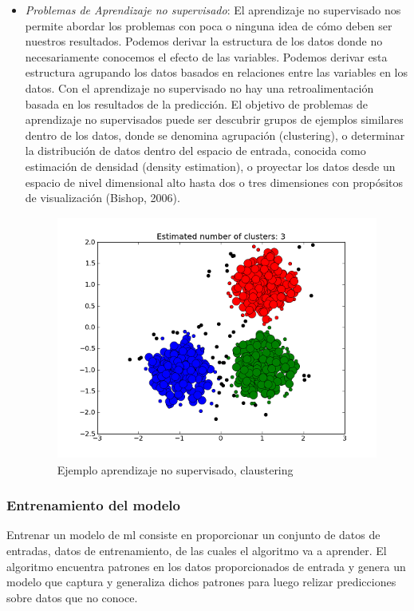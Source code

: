 \begin{itemize}
\item \textit{Problemas de Aprendizaje no supervisado}: El aprendizaje no supervisado nos permite abordar los problemas con
poca o ninguna idea de cómo deben ser nuestros resultados. Podemos derivar la estructura de los datos donde no necesariamente conocemos el efecto de las variables. Podemos derivar esta estructura agrupando los datos basados en relaciones entre las variables en los datos. Con el aprendizaje no supervisado no hay una retroalimentación basada en los resultados de la predicción. El objetivo de problemas de aprendizaje no supervisados puede ser descubrir grupos de ejemplos similares dentro de los datos, donde se denomina agrupación (clustering), o determinar la distribución de datos dentro del espacio de entrada, conocida como estimación de densidad (density estimation), o proyectar los datos desde un espacio de nivel dimensional alto hasta dos o tres dimensiones con propósitos de visualización (Bishop, 2006).

\begin{figure}[H] \centering
  \includegraphics[height=8cm,keepaspectratio=true,clip=true]{imagenes/MarcoTeorico/claustering.png}
  \caption{Ejemplo aprendizaje no supervisado, claustering}\label{Fig:clauster}
\end{figure}
\end{itemize}

\subsubsection{Entrenamiento del modelo}
Entrenar un modelo de \ac{ml} consiste en proporcionar un conjunto de datos de entradas, datos de entrenamiento, de las cuales el algoritmo va a aprender. El algoritmo encuentra patrones en los datos proporcionados de entrada y genera un modelo que captura y generaliza dichos patrones para luego relizar predicciones sobre datos que no conoce.

